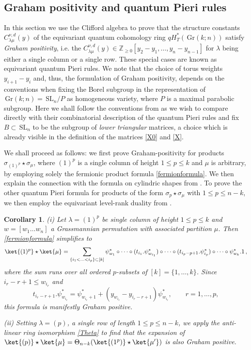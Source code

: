 \documentclass[12pt]{amsart}
\newcommand{\Z}{\mathbb{Z}}
\newcommand{\SL}{\,\mathrm{SL}}
\newcommand{\Gr}{\,\mathrm{Gr}}
\newtheorem{cor}[prop]{Corollary}
\numberwithin{equation}{section}
\numberwithin{figure}{section}
\begin{document}
\subsection{Graham positivity and quantum Pieri rules}\label{sec:Pieri}
In this section we use the Clifford algebra to prove that the structure constants $C^{\nu,d}_{\lambda\mu}(y)$ of the equivariant quantum cohomology ring $qH^*_T(\Gr(k;n))$ satisfy {\em Graham positivity}, i.e. the $C^{\nu,d}_{\lambda\mu}(y)\in\Z_{\ge 0}[y_2-y_1,\ldots,y_n-y_{n-1}]$  for $\lambda$ being either a single column or a single row. These special cases are known as equivariant quantum Pieri rules. We note that the choice of torus weights $y_{i+1}-y_i$ and, thus, the formulation of Graham positivity, depends on the conventions when fixing the Borel subgroup in the representation of $\Gr(k;n)=\SL_n/P$ as homogeneous variety, where $P$ is a maximal parabolic subgroup. Here we shall follow the conventions from \cite{BEMT22} as we wish to compare directly with their combinatorial description of the quantum Pieri rules \cite[Thm 1.1]{BEMT22} and fix $B\subset\SL_n$ to be the subgroup of {\em lower triangular} matrices, a choice which is already visible in the definition of the matrices \eqref{X0} and \eqref{X}.

We shall proceed as follows: we first prove Graham-positivity for products $\sigma_{(1)^p}\star\sigma_\mu$, where $(1)^p$ is a single column of height $1\le p\le k$ and $\mu$ is arbitrary, by employing solely the fermionic product formula \eqref{fermionformula}. We then explain the connection with the formula on cylindric shapes from \cite[Thm 1.1]{BEMT22}. To prove the other quantum Pieri formula for products of the form $\sigma_p\star\sigma_\mu$ with $1\le p\le n-k$, we then employ the equivariant level-rank duality from \cite{gorbounovkorff2014}.


\begin{cor}\label{PieriPos}
    (i) Let $\lambda=(1)^p$ be single column of height $1\le p\le k$ and $w=[w_1\ldots w_n]$ a Grassmannian permutation with associated partition $\mu$. Then \eqref{fermionformula} simplifies to
    \[
    \ket{(1)^p} \star \ket{\mu} = \sum_{\{i_1<\ldots<i_p\}\subset[k]}
    \psi^*_{w_1}\circ\cdots\circ(t_{i_1}.\psi^*_{w_{i_1}})\circ\cdots\circ(t_{i_p-p+1}.\psi^*_{i_p})\circ\cdots\circ\psi^*_{w_k}.1\,,
    \]
    where the sum runs over all ordered $p$-subsets of $[k]=\{1,\ldots,k\}$. Since $i_r-r+1\le w_{i_r}$ and
    \[
    t_{i_r-r+1}.\psi^*_{w_{i_r}}=\psi^*_{w_{i_r}+1}+(y_{w_{i_r}}-y_{i_r-r+1})\psi^*_{w_{i_r}},\qquad r=1,\ldots,p,
    \]
    this formula is manifestly Graham positive.\medskip

    \noindent (ii) Setting $\lambda=(p)$, a single row of length $1\le p\le n-k$, we apply the anti-linear ring isomorphism \eqref{Theta} to find that the expansion of $\ket{(p)}\star\ket{\mu}=\Theta_{n-k}(\ket{(1^p)}\star\ket{\mu'})$ is also Graham positive.
\end{cor}
\end{document}
